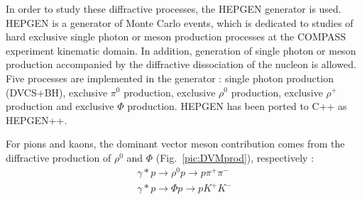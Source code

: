 In order to study these diffractive processes, the HEPGEN generator is used. HEPGEN \cite{HEPGEN} is a generator of Monte Carlo events, which is dedicated to studies of hard exclusive single photon or meson production processes at the COMPASS experiment kinematic domain. In addition, generation of single photon or meson production accompanied by the diffractive dissociation of the nucleon is allowed. Five processes are implemented in the generator : single photon production (DVCS+BH), exclusive $\pi^0$ production, exclusive $\rho^0$ production, exclusive $\rho^+$ production and exclusive $\Phi$ production. HEPGEN has been ported to C++ as HEPGEN++.

For pions and kaons, the dominant vector meson contribution comes from the diffractive production of $\rho^0$ and $\Phi$ (Fig.~\ref{pic:DVMprod}), respectively :
%
\begin{equation}
    \begin{split}
      \gamma * p \rightarrow \rho^0 p \rightarrow p\pi^+\pi^- \\
      \gamma * p \rightarrow \Phi p \rightarrow pK^+K^-
    \end{split}
\end{equation}
%
